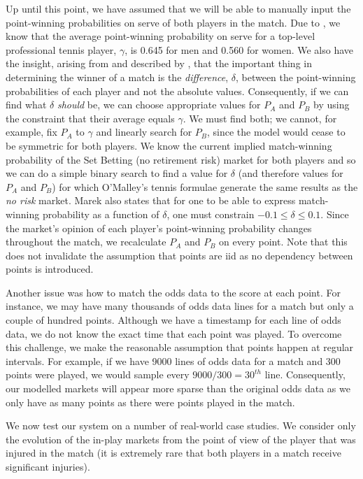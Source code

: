 \documentclass[letterpaper,12pt]{article}
\begin{document}
Up until this point, we have assumed that we will be able to manually input the point-winning probabilities on serve of both players in the match.  Due to \cite{dominance}, we know that the average point-winning probability on serve for a top-level professional tennis player, $\gamma$, is 0.645 for men and 0.560 for women.  We also have the insight, arising from \cite{omalley} and described by \cite{marek}, that the important thing in determining the winner of a match is the \textit{difference}, $\delta$, between the point-winning probabilities of each player and not the absolute values.  Consequently, if we can find what $\delta$ \textit{should} be, we can choose appropriate values for $P_A$ and $P_B$ by using the constraint that their average equals $\gamma$.  We must find both; we cannot, for example, fix $P_A$ to $\gamma$ and linearly search for $P_B$, since the model would cease to be symmetric for both players.  We know the current implied match-winning probability of the Set Betting (no retirement risk) market for both players and so we can do a simple binary search to find a value for $\delta$ (and therefore values for $P_A$ and $P_B$) for which O'Malley's tennis formulae generate the same results as the \textit{no risk} market.  Marek also states that for one to be able to express match-winning probability as a function of $\delta$, one must constrain $-0.1 \leq \delta \leq 0.1$.  Since the market's opinion of each player's point-winning probability changes throughout the match, we recalculate $P_A$ and $P_B$ on every point.  Note that this does not invalidate the assumption that points are iid as no dependency between points is introduced.

Another issue was how to match the odds data to the score at each point.  For instance, we may have many thousands of odds data lines for a match but only a couple of hundred points.  Although we have a timestamp for each line of odds data, we do not know the exact time that each point was played.  To overcome this challenge, we make the reasonable assumption that points happen at regular intervals.  For example, if we have 9000 lines of odds data for a match and 300 points were played, we would sample every $9000 / 300 = 30^{th}$ line.  Consequently, our modelled markets will appear more sparse than the original odds data as we only have as many points as there were points played in the match.

We now test our system on a number of real-world case studies.  We consider only the evolution of the in-play markets from the point of view of the player that was injured in the match (it is extremely rare that both players in a match receive significant injuries).
\end{document}
